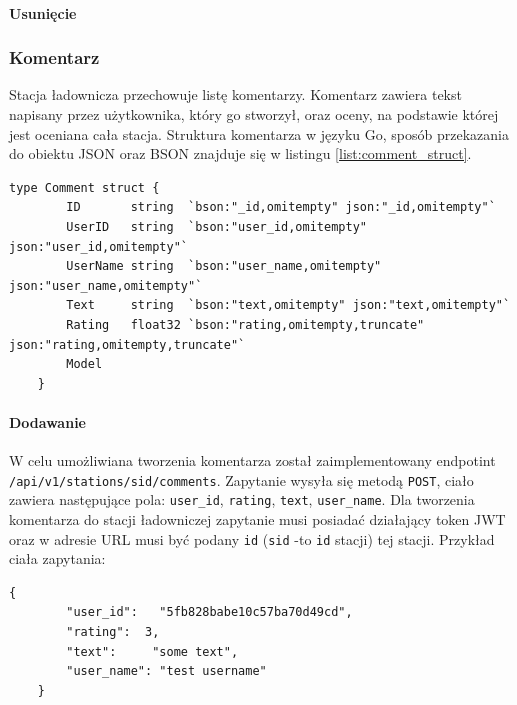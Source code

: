 \paragraph{Usunięcie}
\subsubsection{Komentarz\newline}
Stacja ładownicza przechowuje listę komentarzy. Komentarz zawiera tekst napisany przez użytkownika, który go stworzył, oraz oceny, na podstawie której jest oceniana cała stacja.
Struktura komentarza w języku Go, sposób przekazania do obiektu JSON oraz BSON znajduje się w listingu \ref{list:comment_struct}.
\begin{lstlisting}[label=list:comment_struct,caption=Struktura komentarza,basicstyle=\tiny\ttfamily]
    type Comment struct {
        ID       string  `bson:"_id,omitempty" json:"_id,omitempty"`
        UserID   string  `bson:"user_id,omitempty" json:"user_id,omitempty"`
        UserName string  `bson:"user_name,omitempty" json:"user_name,omitempty"`
        Text     string  `bson:"text,omitempty" json:"text,omitempty"`
        Rating   float32 `bson:"rating,omitempty,truncate" json:"rating,omitempty,truncate"`
        Model
    }
\end{lstlisting}

\paragraph{Dodawanie\newline}
W celu umożliwiana tworzenia komentarza został zaimplementowany endpotint \texttt{/api/v1/stations/{sid}/comments}.
Zapytanie wysyła się metodą \texttt{POST}, ciało zawiera następujące pola: \texttt{user\_id}, \texttt{rating}, \texttt{text}, \texttt{user\_name}.
Dla tworzenia komentarza do stacji ładowniczej zapytanie musi posiadać działający token JWT oraz w adresie URL musi być podany \texttt{id} (\texttt{sid} -to \texttt{id} stacji) tej stacji.
Przykład ciała zapytania:
\begin{lstlisting}[basicstyle=\tiny\ttfamily]
    {
		"user_id":   "5fb828babe10c57ba70d49cd",
		"rating":  3,
		"text":     "some text",
		"user_name": "test username"
    }
\end{lstlisting}

